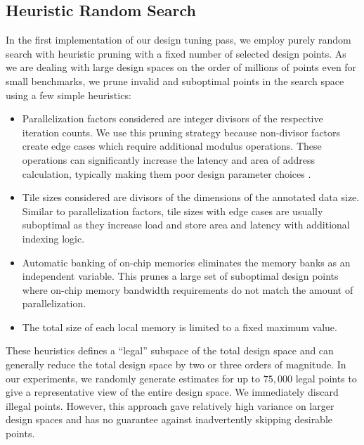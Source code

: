 \subsection{Heuristic Random Search}
In the first implementation of our design tuning pass, we employ purely
random search with heuristic pruning with a fixed number of selected design points.
As we are dealing with large design spaces on the order of millions of points even for small benchmarks,
we prune invalid and suboptimal points in the search space using a few simple heuristics:
\begin{itemize}
  \item Parallelization factors considered are integer divisors of the respective iteration counts. We use this pruning strategy because non-divisor factors create edge cases which require additional modulus operations. These operations can significantly increase the latency and area of address calculation, typically making them poor design parameter choices \cite{raghus-paper}.
  \item Tile sizes considered are divisors of the dimensions of the annotated data size. Similar to parallelization factors, tile sizes with edge cases are usually suboptimal as they increase load and store area and latency with additional indexing logic.
  \item Automatic banking of on-chip memories eliminates the memory banks as an independent variable. This prunes a large set of suboptimal design points where on-chip memory bandwidth requirements do not match the amount of parallelization.
  \item The total size of each local memory is limited to a fixed maximum value.
\end{itemize}

These heuristics defines a ``legal'' subspace of the total design space and can
generally reduce the total design space by two or three orders of magnitude.
In our experiments, we randomly generate estimates for up to $75,000$ legal
points to give a representative view of the entire design space. We immediately
discard illegal points. However, this approach gave relatively high variance
on larger design spaces and has no guarantee against inadvertently skipping desirable points.

